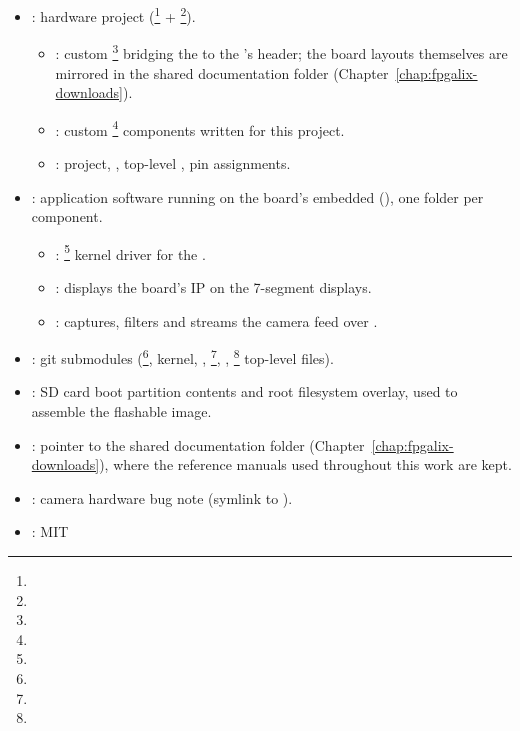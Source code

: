 \begin{itemize}
    \item {}:  hardware project (\footnote{} + \footnote{}).
    \begin{itemize}
        \item {}: custom \footnote{} bridging the  to the 's  header; the board layouts themselves are mirrored in the shared documentation folder (Chapter~\ref{chap:fpgalix-downloads}).
        \item {}: custom  \footnote{} components written for this project.
        \item {}:  project, , top-level , pin assignments.
    \end{itemize}
    \item {}: application software running on the board's embedded  (), one folder per component.
    \begin{itemize}
        \item {}: \footnote{} kernel driver for the .
        \item {}: displays the board's IP on the 7-segment displays.
        \item {}: captures, filters and streams the camera feed over .
    \end{itemize}
    \item {}: git submodules (\footnote{},  kernel, , \footnote{}, , \footnote{}  top-level files).
    \item {}: SD card boot partition contents and root filesystem overlay, used to assemble the flashable image.
    \item {}: pointer to the shared documentation folder (Chapter~\ref{chap:fpgalix-downloads}), where the reference manuals used throughout this work are kept.
    \item {}: camera hardware bug note (symlink to ).
    \item {}: MIT
\end{itemize}
